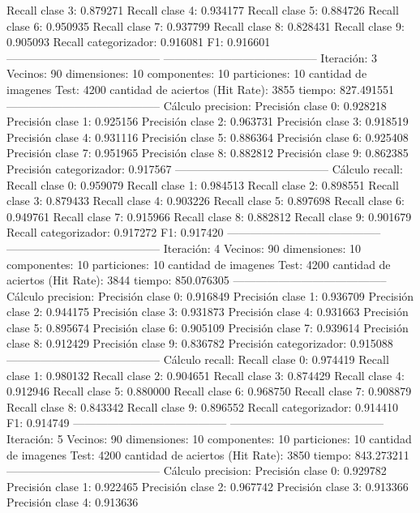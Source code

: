Recall clase 3: 0.879271
Recall clase 4: 0.934177
Recall clase 5: 0.884726
Recall clase 6: 0.950935
Recall clase 7: 0.937799
Recall clase 8: 0.828431
Recall clase 9: 0.905093
Recall categorizador: 0.916081
F1: 0.916601
-----------------------------------------
-----------------------------------------
Iteración: 3
Vecinos: 90
dimensiones: 10
componentes: 10
particiones: 10
cantidad de imagenes Test: 4200
cantidad de aciertos (Hit Rate): 3855
tiempo: 827.491551
-----------------------------------------
Cálculo precision: 
Precisión clase 0: 0.928218
Precisión clase 1: 0.925156
Precisión clase 2: 0.963731
Precisión clase 3: 0.918519
Precisión clase 4: 0.931116
Precisión clase 5: 0.886364
Precisión clase 6: 0.925408
Precisión clase 7: 0.951965
Precisión clase 8: 0.882812
Precisión clase 9: 0.862385
Precisión categorizador: 0.917567
-----------------------------------------
Cálculo recall: 
Recall clase 0: 0.959079
Recall clase 1: 0.984513
Recall clase 2: 0.898551
Recall clase 3: 0.879433
Recall clase 4: 0.903226
Recall clase 5: 0.897698
Recall clase 6: 0.949761
Recall clase 7: 0.915966
Recall clase 8: 0.882812
Recall clase 9: 0.901679
Recall categorizador: 0.917272
F1: 0.917420
-----------------------------------------
-----------------------------------------
Iteración: 4
Vecinos: 90
dimensiones: 10
componentes: 10
particiones: 10
cantidad de imagenes Test: 4200
cantidad de aciertos (Hit Rate): 3844
tiempo: 850.076305
-----------------------------------------
Cálculo precision: 
Precisión clase 0: 0.916849
Precisión clase 1: 0.936709
Precisión clase 2: 0.944175
Precisión clase 3: 0.931873
Precisión clase 4: 0.931663
Precisión clase 5: 0.895674
Precisión clase 6: 0.905109
Precisión clase 7: 0.939614
Precisión clase 8: 0.912429
Precisión clase 9: 0.836782
Precisión categorizador: 0.915088
-----------------------------------------
Cálculo recall: 
Recall clase 0: 0.974419
Recall clase 1: 0.980132
Recall clase 2: 0.904651
Recall clase 3: 0.874429
Recall clase 4: 0.912946
Recall clase 5: 0.880000
Recall clase 6: 0.968750
Recall clase 7: 0.908879
Recall clase 8: 0.843342
Recall clase 9: 0.896552
Recall categorizador: 0.914410
F1: 0.914749
-----------------------------------------
-----------------------------------------
Iteración: 5
Vecinos: 90
dimensiones: 10
componentes: 10
particiones: 10
cantidad de imagenes Test: 4200
cantidad de aciertos (Hit Rate): 3850
tiempo: 843.273211
-----------------------------------------
Cálculo precision: 
Precisión clase 0: 0.929782
Precisión clase 1: 0.922465
Precisión clase 2: 0.967742
Precisión clase 3: 0.913366
Precisión clase 4: 0.913636
